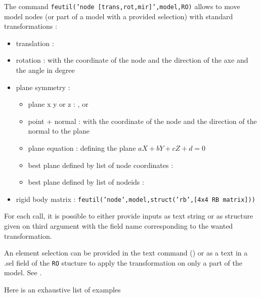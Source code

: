 
The command {\tt feutil('node [trans,rot,mir]',model,RO)} allows to move model nodes (or part of a model with a provided selection) with standard transformations :

\begin{itemize}
\item translation :  
\item rotation :   with  the coordinate of the node and  the direction of the axe and  the angle in degree 
\item plane symmetry : 
\begin{itemize}
\item plane x y or z :  ,   or  
\item point + normal :   with  the coordinate of the node and  the direction of the normal to the plane
\item plane equation :   defining the plane $aX+bY+cZ+d=0$
\item best plane defined by list of node coordinates : 
\item best plane defined by list of nodeids :  
\end{itemize}
\item rigid body matrix : {\tt feutil('node',model,struct('rb',[4x4 RB matrix]))}
\end{itemize}

For each call, it is possible to either provide inputs as text string or as structure given on third argument with the field name corresponding to the wanted transformation. 

An element selection can be provided in the text command () or as a text in a {.sel} field of the {\tt RO} stucture to apply the transformation on only a part of the model. See .

Here is an exhaustive list of examples

